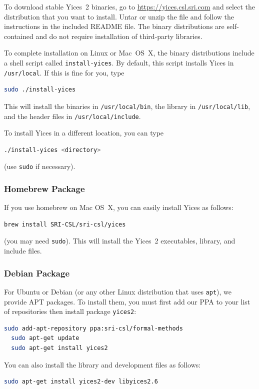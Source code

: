 \documentclass[11pt,twoside,fleqn,openright,titlepage]{cslreport}
\begin{document}
To download stable Yices~2 binaries, go to
\url{https://yices.csl.sri.com} and select the distribution that you
want to install.  Untar or unzip the file and follow the instructions
in the included README file.  The binary distributions are
self-contained and do not require installation of third-party
libraries.

\medskip\noindent
To complete installation on Linux or Mac~OS~X, the binary
distributions include a shell script called \texttt{install-yices}. By
default, this script installs Yices in \texttt{/usr/local}. If
this is fine for you, type
\begin{small}
\begin{lstlisting}[language=sh]
   sudo ./install-yices
\end{lstlisting}
\end{small}
This will install the binaries in \texttt{/usr/local/bin}, the library
in \texttt{/usr/local/lib}, and the header files in
\texttt{/usr/local/include}.

\medskip\noindent
To install Yices in a different location, you can type
\begin{small}
\begin{lstlisting}[language=sh]
   ./install-yices <directory>
\end{lstlisting}
\end{small}
(use \texttt{sudo} if necessary).


\subsubsection{Homebrew Package}

If you use homebrew on Mac OS~X, you can easily install Yices as follows:
\begin{small}
\begin{lstlisting}[language=sh]
   brew install SRI-CSL/sri-csl/yices
\end{lstlisting}
\end{small}
(you may need \texttt{sudo}). This will install the Yices~2
executables, library, and include files.


\subsubsection{Debian Package}

For Ubuntu or Debian (or any other Linux distribution that uses
\texttt{apt}), we provide APT packages. To install them, you must
first add our PPA to your list of repositories then install package
\texttt{yices2}:
\begin{small}
\begin{lstlisting}[language=sh]
  sudo add-apt-repository ppa:sri-csl/formal-methods
  sudo apt-get update
  sudo apt-get install yices2
\end{lstlisting}
\end{small}
You can also install the library and development files as follows:
\begin{small}
\begin{lstlisting}[language=sh]
  sudo apt-get install yices2-dev libyices2.6
\end{lstlisting}
\end{small}
\end{document}
